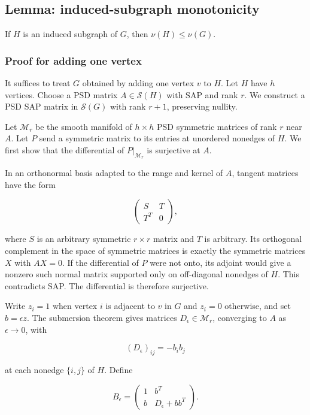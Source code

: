 \documentclass[10pt,a4paper]{article}
\begin{document}

\subsection{Lemma: induced-subgraph
monotonicity}\label{lemma-induced-subgraph-monotonicity}

If \(H\) is an induced subgraph of \(G\), then \(\nu(H)\le\nu(G)\).

\subsubsection{Proof for adding one
vertex}\label{proof-for-adding-one-vertex}

It suffices to treat \(G\) obtained by adding one vertex \(v\) to \(H\).
Let \(H\) have \(h\) vertices. Choose a PSD matrix \(A\in\mathcal S(H)\)
with SAP and rank \(r\). We construct a PSD SAP matrix in
\(\mathcal S(G)\) with rank \(r+1\), preserving nullity.

Let \(\mathcal M_r\) be the smooth manifold of \(h\times h\) PSD
symmetric matrices of rank \(r\) near \(A\). Let \(P\) send a symmetric
matrix to its entries at unordered nonedges of \(H\). We first show that
the differential of \(P|_{\mathcal M_r}\) is surjective at \(A\).

In an orthonormal basis adapted to the range and kernel of \(A\),
tangent matrices have the form

\[
\begin{pmatrix}S&T\\T^T&0\end{pmatrix},
\]

where \(S\) is an arbitrary symmetric \(r\times r\) matrix and \(T\) is
arbitrary. Its orthogonal complement in the space of symmetric matrices
is exactly the symmetric matrices \(X\) with \(AX=0\). If the
differential of \(P\) were not onto, its adjoint would give a nonzero
such normal matrix supported only on off-diagonal nonedges of \(H\).
This contradicts SAP. The differential is therefore surjective.

Write \(z_i=1\) when vertex \(i\) is adjacent to \(v\) in \(G\) and
\(z_i=0\) otherwise, and set \(b=\epsilon z\). The submersion theorem
gives matrices \(D_\epsilon\in\mathcal M_r\), converging to \(A\) as
\(\epsilon\to0\), with

\[
(D_\epsilon)_{ij}=-b_i b_j
\]

at each nonedge \(\{i,j\}\) of \(H\). Define

\[
B_\epsilon=\begin{pmatrix}1&b^T\\b&D_\epsilon+bb^T\end{pmatrix}.
\]
\end{document}

